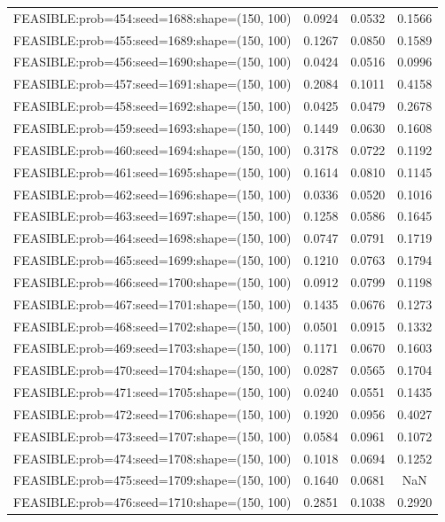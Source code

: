\begin{longtable}{lccc}
FEASIBLE:prob=454:seed=1688:shape=(150, 100) & 0.0924 & 0.0532 & 0.1566 \\
FEASIBLE:prob=455:seed=1689:shape=(150, 100) & 0.1267 & 0.0850 & 0.1589 \\
FEASIBLE:prob=456:seed=1690:shape=(150, 100) & 0.0424 & 0.0516 & 0.0996 \\
FEASIBLE:prob=457:seed=1691:shape=(150, 100) & 0.2084 & 0.1011 & 0.4158 \\
FEASIBLE:prob=458:seed=1692:shape=(150, 100) & 0.0425 & 0.0479 & 0.2678 \\
FEASIBLE:prob=459:seed=1693:shape=(150, 100) & 0.1449 & 0.0630 & 0.1608 \\
FEASIBLE:prob=460:seed=1694:shape=(150, 100) & 0.3178 & 0.0722 & 0.1192 \\
FEASIBLE:prob=461:seed=1695:shape=(150, 100) & 0.1614 & 0.0810 & 0.1145 \\
FEASIBLE:prob=462:seed=1696:shape=(150, 100) & 0.0336 & 0.0520 & 0.1016 \\
FEASIBLE:prob=463:seed=1697:shape=(150, 100) & 0.1258 & 0.0586 & 0.1645 \\
FEASIBLE:prob=464:seed=1698:shape=(150, 100) & 0.0747 & 0.0791 & 0.1719 \\
FEASIBLE:prob=465:seed=1699:shape=(150, 100) & 0.1210 & 0.0763 & 0.1794 \\
FEASIBLE:prob=466:seed=1700:shape=(150, 100) & 0.0912 & 0.0799 & 0.1198 \\
FEASIBLE:prob=467:seed=1701:shape=(150, 100) & 0.1435 & 0.0676 & 0.1273 \\
FEASIBLE:prob=468:seed=1702:shape=(150, 100) & 0.0501 & 0.0915 & 0.1332 \\
FEASIBLE:prob=469:seed=1703:shape=(150, 100) & 0.1171 & 0.0670 & 0.1603 \\
FEASIBLE:prob=470:seed=1704:shape=(150, 100) & 0.0287 & 0.0565 & 0.1704 \\
FEASIBLE:prob=471:seed=1705:shape=(150, 100) & 0.0240 & 0.0551 & 0.1435 \\
FEASIBLE:prob=472:seed=1706:shape=(150, 100) & 0.1920 & 0.0956 & 0.4027 \\
FEASIBLE:prob=473:seed=1707:shape=(150, 100) & 0.0584 & 0.0961 & 0.1072 \\
FEASIBLE:prob=474:seed=1708:shape=(150, 100) & 0.1018 & 0.0694 & 0.1252 \\
FEASIBLE:prob=475:seed=1709:shape=(150, 100) & 0.1640 & 0.0681 &    NaN \\
FEASIBLE:prob=476:seed=1710:shape=(150, 100) & 0.2851 & 0.1038 & 0.2920 \\

\end{longtable}
